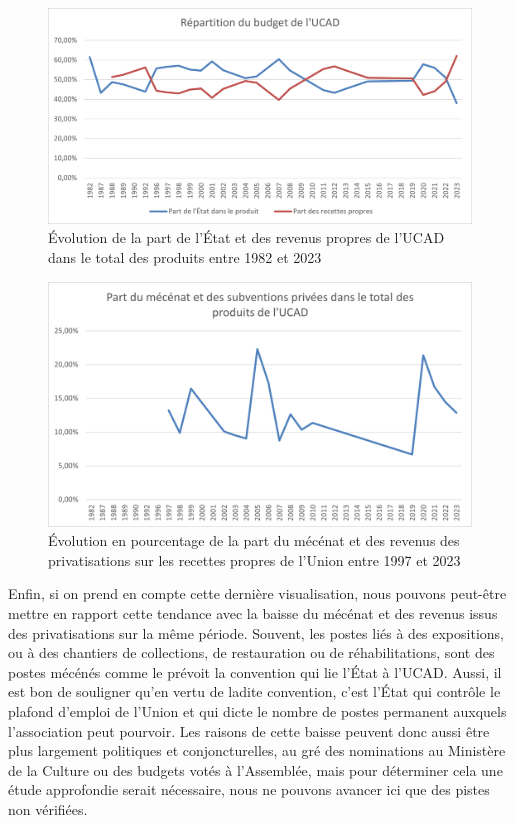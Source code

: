 \begin{figure}[H]
    \centering
    \includegraphics[width=0.75\linewidth]{Illustrations/Image2.png}
    \caption{Évolution de la part de l'État et des revenus propres de l'UCAD dans le total des produits entre 1982 et 2023}
    \label{fig:placeholder}
\end{figure}

\begin{figure}[H]
    \centering
    \includegraphics[width=0.75\linewidth]{Illustrations/Image3.png}
    \caption{Évolution en pourcentage de la part du mécénat et des revenus des privatisations sur les recettes propres de l'Union entre 1997 et 2023}
    \label{fig:placeholder}
\end{figure}

Enfin, si on prend en compte cette dernière visualisation, nous pouvons peut-être mettre en rapport cette tendance avec la baisse du mécénat et des revenus issus des privatisations sur la même période. Souvent, les postes liés à des expositions, ou à des chantiers de collections, de restauration ou de réhabilitations, sont des postes mécénés comme le prévoit la convention qui lie l'État à l'UCAD. Aussi, il est bon de souligner qu'en vertu de ladite convention, c'est l'État qui contrôle le plafond d'emploi de l'Union et qui dicte le nombre de postes permanent auxquels l'association peut pourvoir. Les raisons de cette baisse peuvent donc aussi être plus largement politiques et conjoncturelles, au gré des nominations au Ministère de la Culture ou des budgets votés à l'Assemblée, mais pour déterminer cela une étude approfondie serait nécessaire, nous ne pouvons avancer ici que des pistes non vérifiées. 

